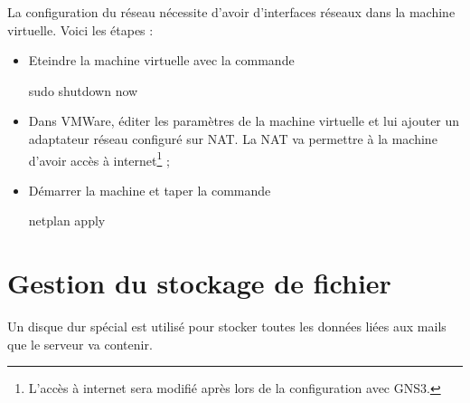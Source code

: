 \documentclass[a4paper,12pt,french]{report} %
\begin{document}
La configuration du réseau nécessite d'avoir d'interfaces réseaux dans la machine virtuelle. Voici les étapes : 
\begin{itemize}
	\item Eteindre la machine virtuelle avec la commande 
	\begin{exempleConsole}
		sudo shutdown now 
	\end{exempleConsole}
	\item Dans VMWare, éditer les paramètres de la machine virtuelle et lui ajouter un adaptateur réseau configuré sur NAT. La NAT va permettre à la machine d'avoir accès à internet\footnote{L'accès à internet sera modifié après lors de la configuration avec GNS3.} ;
	\item Démarrer la machine et taper la commande
	\begin{exempleConsole}
	netplan apply
	\end{exempleConsole}
\end{itemize}
	

\section{Gestion du stockage de fichier}
	Un disque dur spécial est utilisé pour stocker toutes les données liées aux mails que le serveur va contenir.
\end{document}
